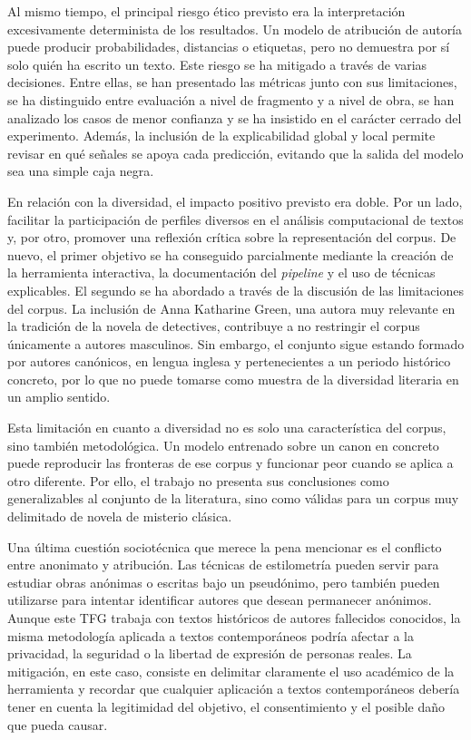 \documentclass[IB]{TFUOC}%
\begin{document}
Al mismo tiempo, el principal riesgo ético previsto era la interpretación excesivamente determinista de los resultados. Un modelo de atribución de autoría puede producir probabilidades, distancias o etiquetas, pero no demuestra por sí solo quién ha escrito un texto. Este riesgo se ha mitigado a través de varias decisiones. Entre ellas, se han presentado las métricas junto con sus limitaciones, se ha distinguido entre evaluación a nivel de fragmento y a nivel de obra, se han analizado los casos de menor confianza y se ha insistido en el carácter cerrado del experimento. Además, la inclusión de la explicabilidad global y local permite revisar en qué señales se apoya cada predicción, evitando que la salida del modelo sea una simple caja negra.

En relación con la diversidad, el impacto positivo previsto era doble. Por un lado, facilitar la participación de perfiles diversos en el análisis computacional de textos y, por otro, promover una reflexión crítica sobre la representación del corpus. De nuevo, el primer objetivo se ha conseguido parcialmente mediante la creación de la herramienta interactiva, la documentación del \textit{pipeline} y el uso de técnicas explicables. El segundo se ha abordado a través de la discusión de las limitaciones del corpus. La inclusión de Anna Katharine Green, una autora muy relevante en la tradición de la novela de detectives, contribuye a no restringir el corpus únicamente a autores masculinos. Sin embargo, el conjunto sigue estando formado por autores canónicos, en lengua inglesa y pertenecientes a un periodo histórico concreto, por lo que no puede tomarse como muestra de la diversidad literaria en un amplio sentido.

Esta limitación en cuanto a diversidad no es solo una característica del corpus, sino también metodológica. Un modelo entrenado sobre un canon en concreto puede reproducir las fronteras de ese corpus y funcionar peor cuando se aplica a otro diferente. Por ello, el trabajo no presenta sus conclusiones como generalizables al conjunto de la literatura, sino como válidas para un corpus muy delimitado de novela de misterio clásica.

Una última cuestión sociotécnica que merece la pena mencionar es el conflicto entre anonimato y atribución. Las técnicas de estilometría pueden servir para estudiar obras anónimas o escritas bajo un pseudónimo, pero también pueden utilizarse para intentar identificar autores que desean permanecer anónimos. Aunque este TFG trabaja con textos históricos de autores fallecidos conocidos, la misma metodología aplicada a textos contemporáneos podría afectar a la privacidad, la seguridad o la libertad de expresión de personas reales. La mitigación, en este caso, consiste en delimitar claramente el uso académico de la herramienta y recordar que cualquier aplicación a textos contemporáneos debería tener en cuenta la legitimidad del objetivo, el consentimiento y el posible daño que pueda causar.
\end{document}

